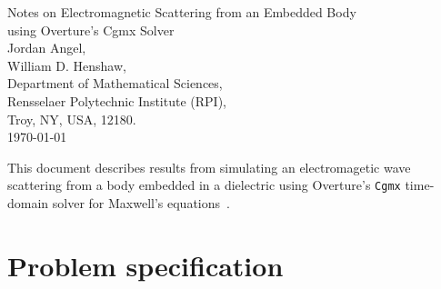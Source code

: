 \documentclass[11pt]{article}
\begin{document}

\newcommand{\eps}{\epsilon}
\newcommand{\ds}{\Delta s}

\newcommand{\Gc}{{\mathcal G}}

\newcommand{\bogus}[1]{}  %

\vspace{5\baselineskip}
\begin{flushleft}
{\LARGE
Notes on Electromagnetic Scattering from an Embedded Body \\
using Overture's Cgmx Solver\\
}
\vspace{2\baselineskip}
Jordan Angel,  \\
William D. Henshaw, \\
% 
\vspace{2\baselineskip}
% 
Department of Mathematical Sciences, \\
Rensselaer Polytechnic Institute (RPI), \\
Troy, NY, USA, 12180. \\
\vspace{\baselineskip}
\today\\

\vspace{4\baselineskip}


This document describes results from simulating an electromagetic wave scattering from a
body embedded in a dielectric using Overture's {\tt Cgmx} time-domain solver for
Maxwell's equations~\cite{CgmxUserGuide}. 

\end{flushleft}

\tableofcontents

\clearpage


\section{Problem specification}
\end{document}
